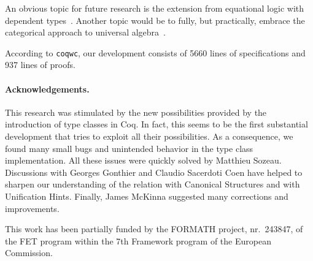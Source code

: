 \documentclass[a4paper,10pt,runningheads]{llncs}
\begin{document}
An obvious topic for future research is the extension from equational logic with dependent types~\cite{Cartmell,palmgren2007partial}. Another topic would be to fully, but practically, embrace the
categorical approach to universal algebra~\cite{pitts2001categorical}.

According to \lstinline|coqwc|, our development consists of 5660 lines of specifications and 937 lines of proofs.



\paragraph{Acknowledgements.}
This research was stimulated by the new possibilities provided by the introduction of type classes
in Coq. In fact, this seems to be the first substantial development that tries to exploit all their
possibilities. As a consequence, we found many small bugs and unintended behavior in the type
class implementation. All these issues were quickly solved by Matthieu Sozeau. Discussions with
Georges Gonthier and Claudio Sacerdoti Coen have helped to
sharpen our understanding of the relation with Canonical Structures and with Unification Hints. Finally, James McKinna suggested many corrections and improvements.


This work has been partially funded by the FORMATH project, nr.\ 243847, of the FET program within the 7th Framework program of the European Commission.


\end{document}
